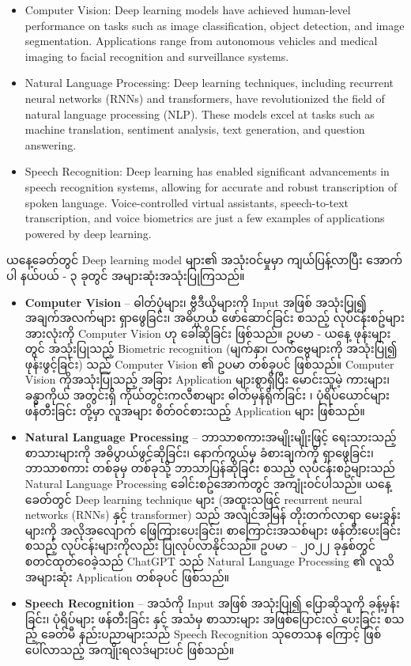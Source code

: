 \begin{itemize}
  \item Computer Vision: Deep learning models have achieved human-level performance on tasks such as image classification, object detection, and image segmentation. Applications range from autonomous vehicles and medical imaging to facial recognition and surveillance systems.
  \item Natural Language Processing: Deep learning techniques, including recurrent neural networks (RNNs) and transformers, have revolutionized the field of natural language processing (NLP). These models excel at tasks such as machine translation, sentiment analysis, text generation, and question answering.
  \item Speech Recognition: Deep learning has enabled significant advancements in speech recognition systems, allowing for accurate and robust transcription of spoken language. Voice-controlled virtual assistants, speech-to-text transcription, and voice biometrics are just a few examples of applications powered by deep learning.
\end{itemize}

\vspace{2.5em}
\noindent
ယနေ့ခေတ်တွင် Deep learning model များ၏ အသုံး၀င်မှုမှာ ကျယ်ပြန့်လာပြီး အောက်ပါ နယ်ပယ် - ၃ ခုတွင် အများဆုံးအသုံးပြုကြသည်။

\begin{itemize}[f2]
  \item \textbf{Computer Vision} -- ဓါတ်ပုံများ၊ ဗွီဒီယိုများကို Input အဖြစ် အသုံးပြု၍ အချက်အလက်များ ရှာဖွေခြင်း၊ အဓိပ္ပာယ် ဖော်ဆောင်ခြင်း စသည့် လုပ်ငန်းစဥ်များ အားလုံးကို Computer Vision ဟု ခေါ်ဆိုခြင်း ဖြစ်သည်။ ဥပမာ - ယနေ့ ဖုန်းများတွင် အသုံးပြုသည့် Biometric recognition (မျက်နှာ၊ လက်ဗွေများကို အသုံးပြု၍ ဖုန်းဖွင့်ခြင်း) သည်  Computer Vision ၏ ဥပမာ တစ်ခုပင် ဖြစ်သည်။ Computer Vision ကိုအသုံးပြုသည့် အခြား Application များစွာရှိပြီး မောင်းသူမဲ့ ကားများ၊ ခန္ဓာကိုယ် အတွင်းရှိ ကိုယ်တွင်းကလီစာများ ဓါတ်မှန်ရိုက်ခြင်း ၊ ပုံရိပ်ယောင်များ ဖန်တီးခြင်း တို့မှာ လူအများ စိတ်၀င်စားသည့် Application များ ဖြစ်သည်။

  \item \textbf{Natural Language Processing }-- ဘာသာစကားအမျိုးမျိုးဖြင့် ရေးသားသည့် စာသားများကို အဓိပွာယ်ဖွင့်ဆိုခြင်း၊ နောက်ကွယ်မှ ခံစားချက်ကို ရှာဖွေခြင်း၊ ဘာသာစကား တစ်ခုမှ တစ်ခုသို့ ဘာသာပြန်ဆိုခြင်း စသည့် လုပ်ငန်းစဥ်များသည် Natural Language Processing ခေါင်းစဥ်အောက်တွင် အကျုံး၀င်ပါသည်။ ယနေ့ ခေတ်တွင်   Deep learning technique များ (အထူးသဖြင့် recurrent neural networks (RNNs) နှင့် transformer) သည် အလျင်အမြန် တိုးတက်လာရာ မေးခွန်းများကို အလိုအလျောက် ဖြေကြားပေးခြင်း၊ စာကြောင်းအသစ်များ ဖန်တီးပေးခြင်း စသည့် လုပ်ငန်းများကိုလည်း ပြုလုပ်လာနိုင်သည်။ ဥပမာ -- ၂၀၂၂ ခုနှစ်တွင် စတင်ထုတ်၀ေခဲ့သည် ChatGPT \cite{web:chatgpt} သည် Natural Language Processing ၏ လူသိအများဆုံး Application တစ်ခုပင် ဖြစ်သည်။

  \item \textbf{Speech Recognition} -- အသံကို  Input အဖြစ် အသုံးပြု၍ ပြောဆိုသူကို ခန့်မှန်းခြင်း၊ ပုံရိပ်များ ဖန်တီးခြင်း  နှင့် အသံမှ စာသားများ အဖြစ်ပြောင်းလဲ ပေးခြင်း စသည့် ခေတ်မီ နည်းပညာများသည်
  Speech Recognition သုတေသန ကြောင့် ဖြစ်ပေါ်လာသည့် အကျိုးရလဒ်များပင် ဖြစ်သည်။

\end{itemize}


